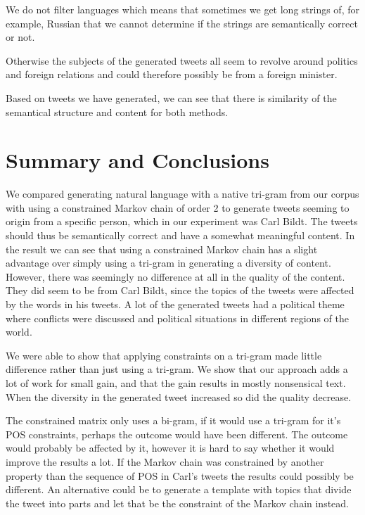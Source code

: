 \documentclass[a4paper,12pt]{article}
\begin{document}
We do not filter languages which means that sometimes we get long strings of, for example, Russian that we cannot determine if the strings are semantically correct or not.

Otherwise the subjects of the generated tweets all seem to revolve around politics and foreign relations and could therefore possibly be from a foreign minister.

Based on tweets we have generated, we can see that there is similarity of the semantical structure and content for both methods. 

\newpage
\section{Summary and Conclusions}
\label{sec:summary}
We compared generating natural language with a native tri-gram from our corpus with using a constrained Markov chain of order 2 to generate tweets seeming to origin from a specific person, which in our experiment was Carl Bildt. 
The tweets should thus be semantically correct and have a somewhat meaningful content.
In the result we can see that using a constrained Markov chain has a slight advantage over simply using a tri-gram in generating a diversity of content. 
However, there was seemingly no difference at all in the quality of the content. 
They did seem to be from Carl Bildt, since the topics of the tweets were affected by the words in his tweets. 
A lot of the generated tweets had a political theme where conflicts were discussed and political situations in different regions of the world. 


We were able to show that applying constraints on a tri-gram made little difference rather than just using a tri-gram. We show that our approach adds a lot of work for small gain, and that the gain results in mostly nonsensical text. When the diversity in the generated tweet increased so did the quality decrease.

The constrained matrix only uses a bi-gram, if it would use a tri-gram for it's POS constraints, perhaps the outcome would have been different. The outcome would probably be affected by it, however it is hard to say whether it would improve the results a lot. If the Markov chain was constrained by another property than the sequence of POS in Carl's tweets the results could possibly be different. An alternative could be to generate a template with topics that divide the tweet into parts and let that be the constraint of the Markov chain instead.



\newpage

\end{document}
